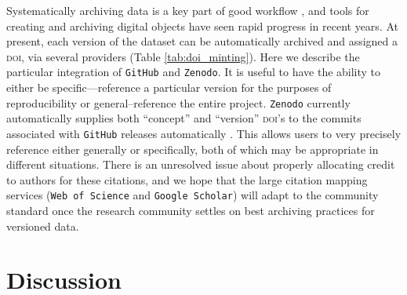 \documentclass[a4paper,11pt]{article}
\begin{document}
Systematically archiving data is a key part of good workflow \citep{Wilkinson-2016, Piwowar-2011, Whitlock-2011}, and tools for creating and archiving digital objects have seen rapid progress in recent years.  At present, each version of the dataset can be automatically archived and assigned a \textsc{doi}, via several providers (Table \ref{tab:doi_minting}).  Here we describe the particular integration of \texttt{GitHub} and \texttt{Zenodo}.  It is useful to have the ability to either be specific---reference a particular version for the purposes of reproducibility or general--reference the entire project.  \texttt{Zenodo} currently automatically supplies both ``concept'' and ``version'' \textsc{doi}'s to the commits associated with \texttt{GitHub} releases automatically \citep[Figure \ref{fig:semantic} and ][]{Nielsen-2017}.  This allows users to very precisely reference either generally or specifically, both of which may be appropriate in different situations.  There is an unresolved issue about properly allocating credit to authors for these citations, and we hope that the large citation mapping services (\texttt{Web of Science} and \texttt{Google Scholar}) will adapt to the community standard once the research community settles on best archiving practices for versioned data.

\section{Discussion}





\end{document}
